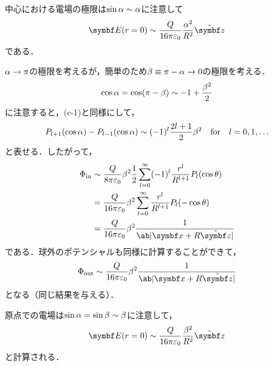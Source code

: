   中心における電場の極限は$\sin\alpha \sim \alpha$に注意して
  \begin{gather}%
    \bs{E}(r = 0) \sim \frac{Q}{16\pi \eps_0}\frac{\al^2}{R^2} \hat{\bs{z}}
  \end{gather}%
  である．

  $\alpha \to \pi$の極限を考えるが，簡単のため$\beta \equiv \pi - \alpha \to 0$の極限を考える．
  \begin{gather}%
    \cos\al = \cos(\pi -\be) \sim -1 + \frac{\be^2}{2}
  \end{gather}%
  に注意すると，(c-1)と同様にして，
  \begin{gather}%
    P_{l+1}(\cos\al) - P_{l-1}(\cos\al) \sim (-1)^l \frac{2l+1}{2} \be^2
    \qqtext{for} l = 0, 1, \ldots
  \end{gather}%
  と表せる．したがって，
  \begin{align}%
    \Phi_{\text{in}} &\sim \frac{Q}{8\pi\eps_0} \be^2
    \frac{1}{2} \sum_{l=0}^\infty (-1)^l \frac{r^l}{R^{l+1}} P_l(\cos\theta)\notag\\
    &= \frac{Q}{16\pi\eps_0}\beta^2 \sum_{l=0}^\infty \frac{r^l}{R^{l+1}} P_l(-\cos\theta)\notag\\
    &= \frac{Q}{16\pi\eps_0} \beta^2 \frac{1}{\ab|\bs{x} + R \hat{\bs{z}}|}
  \end{align}%
  である．球外のポテンシャルも同様に計算することができて，
  \begin{gather}%
    \Phi_{\text{out}} \sim \frac{Q}{16\pi\eps_0} \beta^2 \frac{1}{\ab|\bs{x} + R \hat{\bs{z}}|}
  \end{gather}%
  となる（同じ結果を与える）．

  原点での電場は$\sin\alpha =\sin\beta \sim \beta$に注意して，
  \begin{gather}%
    \bs{E}(r=0) \sim \frac{Q}{16\pi\eps_0} \frac{\be^2}{R^2} \hat{\bs{z}}
  \end{gather}%
  と計算される．

